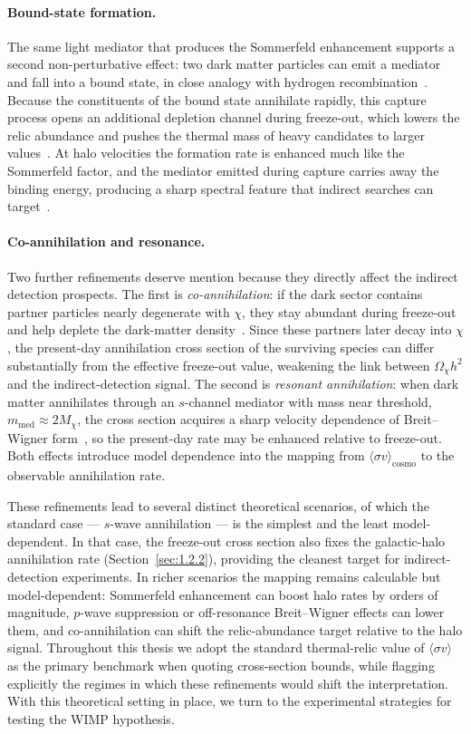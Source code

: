 \paragraph{Bound-state formation.}
The same light mediator that produces the Sommerfeld enhancement supports a second non-perturbative effect: two dark matter particles can emit a mediator and fall into a bound state, in close analogy with hydrogen recombination~\cite{vonHarling:2014kha}.
Because the constituents of the bound state annihilate rapidly, this capture process opens an additional depletion channel during freeze-out, which lowers the relic abundance and pushes the thermal mass of heavy candidates to larger values~\cite{Mitridate:2017izz}.
At halo velocities the formation rate is enhanced much like the Sommerfeld factor, and the mediator emitted during capture carries away the binding energy, producing a sharp spectral feature that indirect searches can target~\cite{Baldes:2020hwx}.

\paragraph{Co-annihilation and resonance.}
Two further refinements deserve mention because they directly affect the indirect detection prospects.
The first is \emph{co-annihilation}: if the dark sector contains partner particles nearly degenerate with $\chi$, they stay abundant during freeze-out and help deplete the dark-matter density~\cite{Ellis:1983ew,Griest:1990kh}.
Since these partners later decay into $\chi$, the present-day annihilation cross section of the surviving species can differ substantially from the effective freeze-out value, weakening the link between $\Omega_\chi h^2$ and the indirect-detection signal.
The second is \emph{resonant annihilation}: when dark matter annihilates through an $s$-channel mediator with mass near threshold, $m_\mathrm{med}\approx 2 M_\chi$, the cross section acquires a sharp velocity dependence of Breit--Wigner form~\cite{Griest:1990kh,Gondolo:1990dk}, so the present-day rate may be enhanced relative to freeze-out.
Both effects introduce model dependence into the mapping from $\langle\sigma v\rangle_\mathrm{cosmo}$ to the observable annihilation rate.

These refinements lead to several distinct theoretical scenarios, of which the standard case --- $s$-wave annihilation --- is the simplest and the least model-dependent.
In that case, the freeze-out cross section also fixes the galactic-halo annihilation rate (Section~\ref{sec:1.2.2}), providing the cleanest target for indirect-detection experiments.
In richer scenarios the mapping remains calculable but model-dependent: Sommerfeld enhancement can boost halo rates by orders of magnitude, $p$-wave suppression or off-resonance Breit--Wigner effects can lower them, and co-annihilation can shift the relic-abundance target relative to the halo signal.
Throughout this thesis we adopt the standard thermal-relic value of $\langle\sigma v\rangle$ as the primary benchmark when quoting cross-section bounds, while flagging explicitly the regimes in which these refinements would shift the interpretation.
With this theoretical setting in place, we turn to the experimental strategies for testing the WIMP hypothesis.
